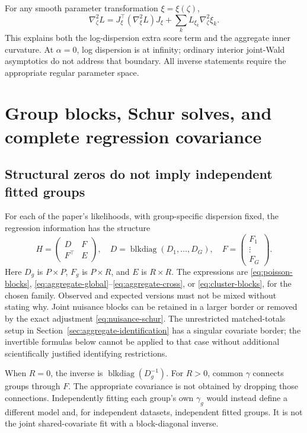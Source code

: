 \documentclass[11pt,a4paper]{article}
\newcommand{\blkdiag}{\operatorname{blkdiag}}
\numberwithin{equation}{section}
\begin{document}
For any smooth parameter transformation $\xi=\xi(\zeta)$,
\begin{equation}
 \nabla_\zeta^2L
 =J_\xi^\top(\nabla_\xi^2L)J_\xi+
       \sum_k L_{\xi_k}\nabla_\zeta^2\xi_k .
 \label{eq:general-transform}
\end{equation}
This explains both the log-dispersion extra score term and the
aggregate inner curvature. At $\alpha=0$, log dispersion is at infinity;
ordinary interior joint-Wald asymptotics do not address that boundary.
All inverse statements require the appropriate regular parameter space.

\section{Group blocks, Schur solves, and complete regression covariance}
\label{sec:covariance}

\subsection{Structural zeros do not imply independent fitted groups}
For each of the paper's likelihoods, with group-specific dispersion fixed,
the regression information has the structure
\begin{equation}
 H=\begin{pmatrix}D&F\\F^\top&E\end{pmatrix},\quad
 D=\blkdiag(D_1,\ldots,D_G),\quad
 F=\begin{pmatrix}F_1\\ \vdots\\ F_G\end{pmatrix}.
 \label{eq:border}
\end{equation}
Here $D_g$ is $P\times P$, $F_g$ is $P\times R$, and $E$ is $R\times R$.
The expressions are \eqref{eq:poisson-blocks},
\eqref{eq:aggregate-global}--\eqref{eq:aggregate-cross}, or
\eqref{eq:cluster-blocks}, for the chosen family.
Observed and expected versions must not be mixed without stating why.
Joint nuisance blocks can be retained in a larger border or removed
by the exact adjustment \eqref{eq:nuisance-schur}.
The unrestricted matched-totals setup in
Section~\ref{sec:aggregate-identification} has a singular covariate
border; the invertible formulas below cannot be applied to that case
without additional scientifically justified identifying restrictions.

When $R=0$, the inverse is $\blkdiag(D_g^{-1})$.
For $R>0$, common $\gamma$ connects groups through $F$.
The appropriate covariance is not obtained by dropping those connections.
Independently fitting each group's own $\gamma_g$ would instead define
a different model and, for independent datasets, independent fitted groups.
It is not the joint shared-covariate fit with a block-diagonal inverse.
\end{document}
